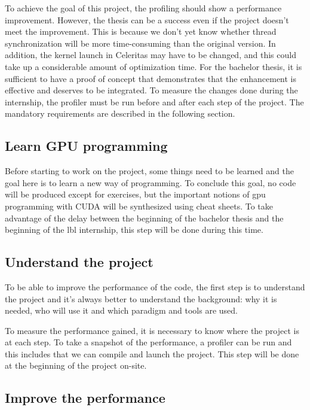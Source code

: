 To achieve the goal of this project, the profiling should show a performance improvement.
However, the thesis can be a success even if the project doesn't meet the improvement.
This is because we don't yet know whether thread synchronization will be more time-consuming than the original version.
In addition, the kernel launch in Celeritas may have to be changed, and this could take up a considerable amount of optimization time.
For the bachelor thesis, it is sufficient to have a proof of concept that demonstrates that the enhancement is effective and deserves to be integrated.
To measure the changes done during the internship, the profiler must be run before and after each step of the project.
The mandatory requirements are described in the following section.

\subsection{Learn GPU programming}
\label{ch:introduction:objectives:learn-gpu-programming}

Before starting to work on the project, some things need to be learned and the goal here is to learn a new way of programming.
To conclude this goal, no code will be produced except for exercises, but the important notions of \acrshort{gpu} programming with CUDA will be synthesized using cheat sheets.
To take advantage of the delay between the beginning of the bachelor thesis and the beginning of the \acrshort{lbl} internship, this step will be done during this time.


\subsection{Understand the project}
\label{ch:introduction:objectives:understand-the-project}

To be able to improve the performance of the code, the first step is to understand the project and it's always better to understand the background: why it is needed, who will use it and which paradigm and tools are used.

To measure the performance gained, it is necessary to know where the project is at each step.
To take a snapshot of the performance, a profiler can be run and this includes that we can compile and launch the project.
This step will be done at the beginning of the project on-site.


\subsection{Improve the performance}
\label{ch:introduction:objectives:improve-the-performance}

